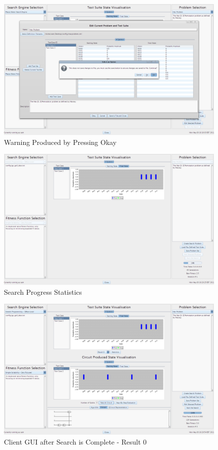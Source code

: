 \begin{figure}
  \includegraphics[width=\textwidth]{walkthrough7.png}
 \caption{Warning Produced by Pressing Okay}
 \label{fig:walkthrough7}
\end{figure}

\begin{figure}
  \includegraphics[width=\textwidth]{walkthrough8.png}
 \caption{Search Progress Statistics}
 \label{fig:walkthrough8}
\end{figure}

\begin{figure}
  \includegraphics[width=\textwidth]{walkthrough9a.png}
 \caption{Client GUI after Search is Complete - Result 0}
 \label{fig:walkthrough9a}
\end{figure}

